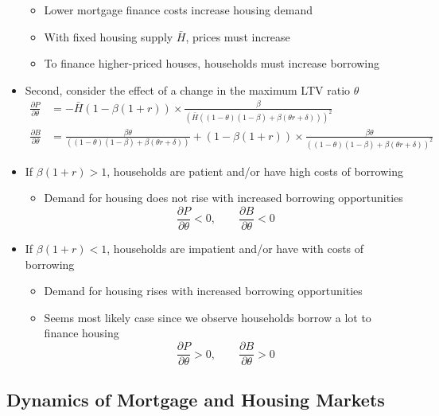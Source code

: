 \documentclass[a4paper,twoside]{article}
\newif\IfInSansMode
\numberwithin{equation}{section}
\numberwithin{figure}{section}
\begin{document}
\begin{itemize}
		\begin{itemize}
			\item Lower mortgage finance costs increase housing demand
			\item With fixed housing supply \( \bar{H} \), prices must increase
			\item To finance higher-priced houses, households must increase borrowing
		\end{itemize}
		\item Second, consider the effect of a \textcolor{myblue}{change in the maximum LTV ratio \( \theta \)}
		\begin{align*}
			\frac{\partial P}{\partial\theta} &= -\bar{H}(1-\beta(1+r)) \times \frac{\beta}{(\bar{H}((1-\theta)(1-\beta)+\beta(\theta r+\delta)))^2} \\
			\frac{\partial B}{\partial\theta} &= \frac{\beta\theta}{((1-\theta)(1-\beta)+\beta(\theta r+\delta))} + (1-\beta(1+r)) \times \frac{\beta\theta}{((1-\theta)(1-\beta)+\beta(\theta r+\delta))^2}
		\end{align*}
		\item If \( \beta(1+r) > 1 \), households are patient and/or have high costs of borrowing
		\begin{itemize}
			\item Demand for housing does not rise with increased borrowing opportunities
			\[
				\frac{\partial P}{\partial \theta} <0, \qquad \frac{\partial B}{\partial \theta} <0 
			\]
		\end{itemize}
		\item If \( \beta(1+r) < 1 \), households are impatient and/or have with costs of borrowing
		\begin{itemize}
			\item Demand for housing rises with increased borrowing opportunities
			\item Seems most likely case since we observe households borrow a lot to finance housing
			\[
				\frac{\partial P}{\partial \theta} >0, \qquad \frac{\partial B}{\partial \theta} >0 
			\]
		\end{itemize}
	\end{itemize}
\subsection{Dynamics of Mortgage and Housing Markets}
\end{document}
